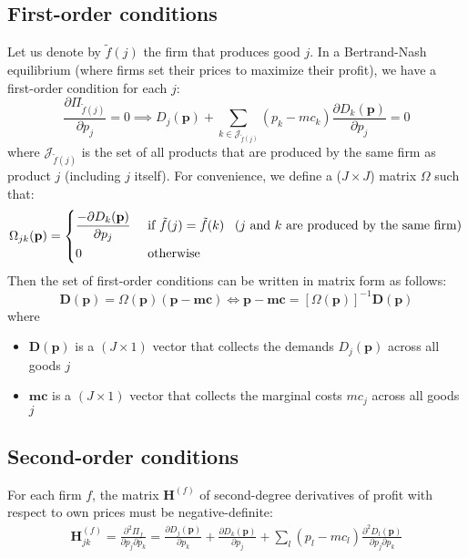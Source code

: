 \documentclass[12pt]{article}
\begin{document}
\subsection{First-order conditions}
Let us denote by $\tilde{f}(j)$ the firm that produces good $j$. In a Bertrand-Nash equilibrium (where firms set their prices to maximize their profit), we have a first-order condition for each $j$:
\begin{equation}
	\frac{\partial \Pi_{\tilde{f}(j)}}{\partial p_j} = 0 \implies D_j(\textbf{p}) + \sum_{k\in \mathcal{J}_{\tilde{f}(j)}} (p_k - mc_k) \frac{\partial D_k(\textbf{p})}{\partial p_j} = 0
\end{equation}
where $\mathcal{J}_{\tilde{f}(j)}$ is the set of all products that are produced by the same firm as product $j$ (including $j$ itself).
For convenience, we define a ($J \times J$) matrix $\Omega$ such that:
\begin{equation}
	\Omega_{jk}(\textbf{p}) =  \left\{ \begin{aligned}
		& \frac{- \partial D_k(\textbf{p})}{\partial p_j} && \text{ if } \tilde{f}(j) = \tilde{f}(k) \hspace*{5pt} \text{ ($j$ and $k$ are produced by the same firm)} \\
		& 0 && \text{ otherwise}
	\end{aligned} \right.
\label{eq:omega}
\end{equation}
Then the set of first-order conditions can be written in matrix form as follows:
\begin{equation}
	\textbf{D}(\textbf{p}) = \Omega(\textbf{p}) (\textbf{p} - \textbf{mc}) \iff \textbf{p} - \textbf{mc} = \left[\Omega(\textbf{p})\right]^{-1} \textbf{D}(\textbf{p})
\label{eq:FOC}
\end{equation}
where
\begin{itemize}
	\setlength\itemsep{0pt}
	\item $\textbf{D}(\textbf{p})$ is a $(J \times 1)$ vector that collects the demands $D_{j}(\textbf{p})$ across all goods $j$
	\item $\textbf{mc}$ is a $(J \times 1)$ vector that collects the marginal costs $mc_{j}$ across all goods $j$
\end{itemize}

\subsection{Second-order conditions}
For each firm $f$, the matrix $\textbf{H}^{(f)}$ of second-degree derivatives of profit with respect to own prices must be negative-definite:
\begin{equation}
\begin{aligned}
	\textbf{H}^{(f)}_{jk} = \frac{\partial^2 \Pi_f}{\partial p_j \partial p_k} = \frac{\partial D_j(\textbf{p})}{\partial p_k} + \frac{\partial D_k(\textbf{p})}{\partial p_j} + \sum_{l} (p_l - mc_l) \frac{\partial^2 D_l(\textbf{p})}{\partial p_j \partial p_k }
\end{aligned}
\label{eq:SOC}
\end{equation}
\end{document}
